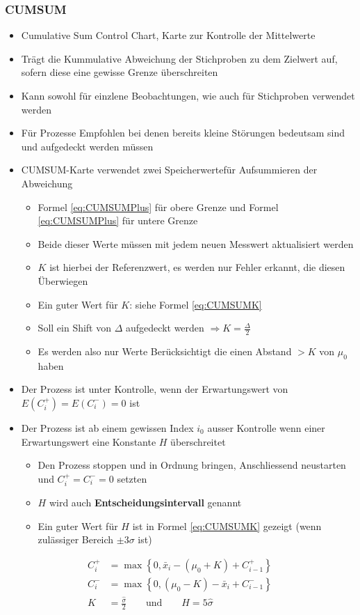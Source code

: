 \subsubsection{CUMSUM}
\begin{itemize}
	\item Cumulative Sum Control Chart, Karte zur Kontrolle der Mittelwerte
	\item Trägt die Kummulative Abweichung der Stichproben zu dem Zielwert auf, sofern diese eine gewisse Grenze überschreiten
	\item Kann sowohl für einzlene Beobachtungen, wie auch für Stichproben verwendet werden
	\item Für Prozesse Empfohlen bei denen bereits kleine Störungen bedeutsam sind und aufgedeckt werden müssen
	\item CUMSUM-Karte verwendet zwei \glqq Speicherwerte\grqq für Aufsummieren der Abweichung
	\begin{itemize}
		\item Formel \ref{eq:CUMSUMPlus} für obere Grenze und Formel \ref{eq:CUMSUMPlus} für untere Grenze
		\item Beide dieser Werte müssen mit jedem neuen Messwert aktualisiert werden
		\item $K$ ist hierbei der Referenzwert, es werden nur Fehler erkannt, die diesen Überwiegen
		\item Ein guter Wert für $K$: siehe Formel \ref{eq:CUMSUMK}
		\item Soll ein Shift von $\Delta$ aufgedeckt werden $\Rightarrow K =\frac{\Delta}{2}$ 
		\item Es werden also nur Werte Berücksichtigt die einen Abstand $>K$ von $\mu_0$ haben
	\end{itemize}
	\item Der Prozess ist unter Kontrolle, wenn der Erwartungswert von $E(C_i^+)=E(C_i^-)=0$ ist
	\item Der Prozess ist ab einem gewissen Index $i_0$ ausser Kontrolle wenn einer Erwartungswert eine Konstante $H$ überschreitet
	\begin{itemize}
		\item Den Prozess stoppen und in Ordnung bringen, Anschliessend neustarten und $C_i^+ = C_i^- = 0$ setzten
		\item $H$ wird auch \textbf{Entscheidungsintervall} genannt
		\item Ein guter Wert für $H$ ist in Formel \ref{eq:CUMSUMK} gezeigt (wenn zulässiger Bereich $\pm 3\sigma$ ist)
	\end{itemize}
\end{itemize}
\begin{align}
	\label{eq:CUMSUMPlus}
	C_i^+&=\max\left\lbrace 0,\bar{x}_i-(\mu_0+K)+C_{i-1}^+\right\rbrace\\
	\label{eq:CUMSUMMinus}
	C_i^-&=\max\left\lbrace 0,(\mu_0-K)-\bar{x}_i+C_{i-1}^-\right\rbrace\\
	\label{eq:CUMSUMK}
	K &= \frac{\hat{\sigma}}{2}\qquad \text{und}\qquad H=5\hat{\sigma}
\end{align}

